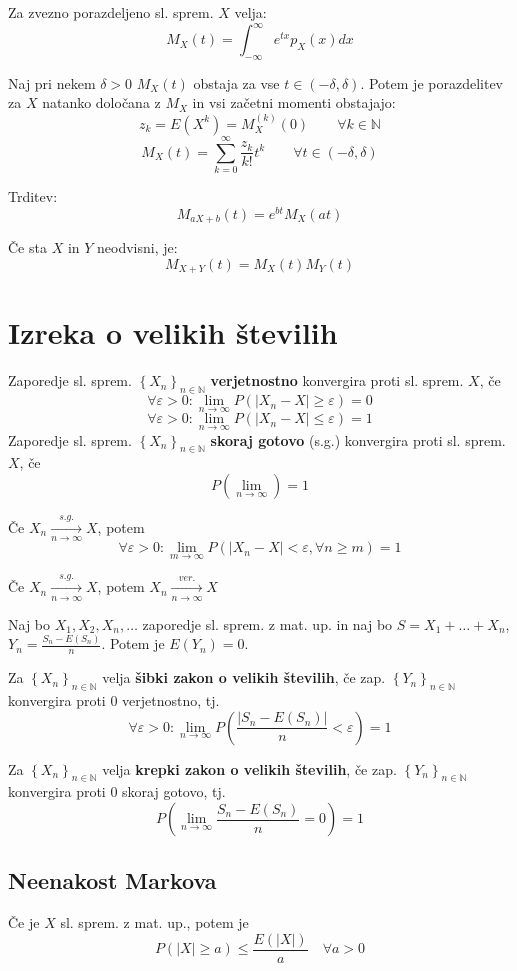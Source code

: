 \begin{multicols}{5}
Za zvezno porazdeljeno sl. sprem. $X$ velja:
\[ M_X(t) = \int_{-\infty}^\infty e^{tx} p_X(x) dx \]


Naj pri nekem $\delta > 0$ $M_X(t)$ obstaja za vse $t \in (-\delta, \delta)$.
Potem je porazdelitev za $X$ natanko določana z $M_X$ in vsi začetni momenti obstajajo:
\[ z_k = E(X^k) = M_X^{(k)}(0) \qquad \forall k \in \mathbb{N}\]
\[ M_X(t) = \sum_{k=0}^\infty \frac{z_k}{k!}t^k \qquad \forall t \in (-\delta, \delta)\] 

Trditev:
\[M_{aX+b}(t) = e^{bt} M_X(at) \]

Če sta $X$ in $Y$ neodvisni, je:
\[ M_{X+Y} (t) = M_X(t) M_Y(t)\]

\section{Izreka o velikih številih}

Zaporedje sl. sprem. $\left\{X_n\right\}_{n\in \mathbb{N}}$ \textbf{verjetnostno} konvergira proti sl. sprem. $X$, če
\[\forall \varepsilon > 0: \lim_{n \to \infty} P(|X_n - X| \geq \varepsilon) = 0\]
\[\forall \varepsilon > 0: \lim_{n \to \infty} P(|X_n - X| \leq \varepsilon) = 1\]
Zaporedje sl. sprem. $\left\{X_n\right\}_{n\in \mathbb{N}}$ \textbf{skoraj gotovo} (s.g.) konvergira proti sl. sprem. $X$, če
\[ P(\lim_{n \to \infty}) = 1 \]

Če $X_n \xrightarrow[n \to \infty]{s.g.} X$, potem
\[\forall \varepsilon > 0: \lim_{m \to \infty} P(|X_n - X| < \varepsilon, \forall n \geq m) = 1\]

Če $X_n \xrightarrow[n \to \infty]{s.g.} X$, potem $X_n \xrightarrow[n \to \infty]{ver.} X$


Naj bo $X_1, X_2, X_n, \dots$ zaporedje sl. sprem. z mat. up. in naj bo $S = X_1 +\dots + X_n$, $Y_n = \frac{S_n - E(S_n)}{n}$. Potem je $E(Y_n) = 0$.

Za $\left\{ X_n \right\}_{n \in \mathbb{N}} $ velja \textbf{šibki zakon o velikih številih}, če zap. $\left\{ Y_n \right\}_{n \in \mathbb{N}}$
konvergira proti 0 verjetnostno, tj.
\[ \forall \varepsilon > 0: \lim_{n \to \infty} P\left(  \frac{|S_n - E(S_n)|}{n} < \varepsilon \right) = 1 \]

Za $\left\{ X_n \right\}_{n \in \mathbb{N}} $ velja \textbf{krepki zakon o velikih številih}, če zap. $\left\{ Y_n \right\}_{n \in \mathbb{N}}$
konvergira proti 0 skoraj gotovo, tj.
\[ P\left( \lim_{n \to \infty} \frac{S_n - E(S_n)}{n} = 0 \right) = 1 \]

\subsection{Neenakost Markova}
Če je $X$ sl. sprem. z mat. up., potem je
\[P(|X| \geq a) \leq \frac{E(|X|)}{a} \quad \forall a > 0\]


\end{multicols}
